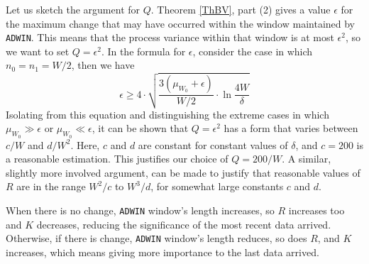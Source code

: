 Let us sketch the argument for $Q$. Theorem \ref{ThBV}, part (2) gives a value $\epsilon$
for the maximum change that may have occurred within the window maintained 
by {\tt ADWIN}. This means that the process variance within that window is at most $\epsilon^2$, 
so we want to set $Q=\epsilon^2$. 
In the formula for $\epsilon$, consider the case in which $n_0 = n_1 = W/2$, then we have
$$
\epsilon \ge 4\cdot \sqrt{{\frac{3 (\mu_{W_0}+\epsilon)}{W/2}} \cdot \ln{\frac{4W}{\delta}} }
$$
Isolating from this equation and distinguishing the extreme cases in which 
$\mu_{W_0} \gg \epsilon$ or $\mu_{W_0} \ll \epsilon$, it can be shown that 
$Q=\epsilon^2$ has a form that varies between $c/W$ and $d/W^2$. Here, $c$ and $d$ are constant
for constant values of $\delta$, and $c=200$ is a reasonable estimation. This justifies
our choice of $Q=200/W$. A similar, slightly more involved argument, 
can be made to justify that reasonable values of $R$ are in the range $W^2/c$ to $W^3/d$, 
for somewhat large constants $c$ and $d$.

When there is no change, {\tt ADWIN} window's length increases, 
so $R$ increases too and $K$ decreases, reducing the significance 
of the most recent data arrived. 
Otherwise, if there is change, {\tt ADWIN} window's length reduces, 
so does $R$, and $K$ increases, which means giving more importance to the last data arrived.


